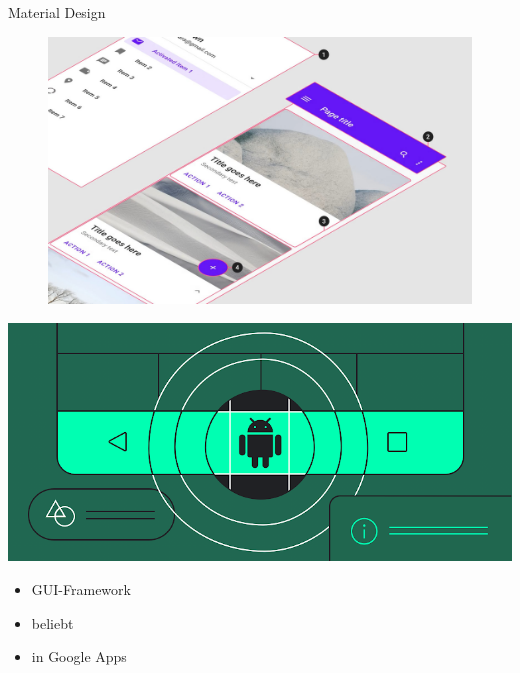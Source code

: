 \documentclass[aspectratio=169]{beamer}
\begin{document}
\begin{frame}[plain]{Material Design}
\begin{varwidth}{.5\textwidth}
        \begin{figure}
            \centering
            \includegraphics[width=\textwidth]{media/material-design-in-action.jpg}
        \end{figure}
    \end{varwidth}
    \hfill
    \begin{varwidth}{.4\textwidth}
        \includegraphics[width=\textwidth]{media/material-android.png}
        \begin{itemize}\pause
            \item GUI-Framework\pause
            \item beliebt\pause
            \item in Google Apps
        \end{itemize}
    \end{varwidth}
\end{frame}
\end{document}
